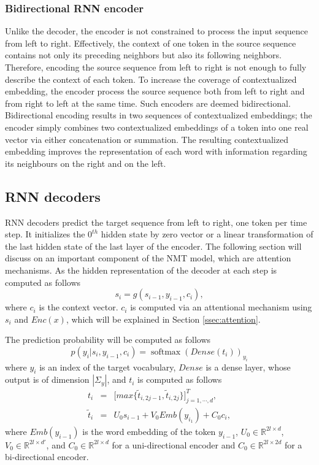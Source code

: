 \subsubsection{Bidirectional RNN encoder}
Unlike the decoder, the encoder is not constrained to process the input sequence from left to right. Effectively, the context of one token in the source sequence contains not only its preceding neighbors but also its following neighbors. Therefore, encoding the source sequence from left to right is not enough to fully describe the context of each token. To increase the coverage of contextualized embedding, the encoder process the source sequence both from left to right and from right to left at the same time. Such encoders are deemed bidirectional. Bidirectional encoding results in two sequences of contextualized embeddings; the encoder simply combines two contextualized embeddings of a token into one real vector via either concatenation or summation. The resulting contextualized embedding improves the representation of each word with information regarding its neighbours on the right and on the left.
\subsection{RNN decoders}
RNN decoders predict the target sequence from left to right, one token per time step. It initializes the $0^{th}$ hidden state by zero vector or a linear transformation of the last hidden state of the last layer of the encoder. The following section will discuss on an important component of the NMT model, which are attention mechanisms. As the hidden representation of the decoder at each step is computed as follows
\begin{equation}
s_i = g(s_{i-1},y_{i-1},c_i),
\end{equation}
where $c_i$ is the context vector. $c_i$ is computed via an attentional mechanism using $s_i$ and $Enc(x)$, which will be explained in Section \ref{ssec:attention}.

The prediction probability will be computed as follows
\begin{equation}
p(y_i|s_i,y_{i-1},c_i) = \operatorname{softmax}(Dense(t_i))_{y_i}
\end{equation}
where $y_i$ is an index of the target vocabulary, $Dense$ is a dense layer, whose output is of dimension $|\Sigma_y|$, and $t_i$ is computed as follows
\begin{equation}
\begin{array}{rcl}
t_i &=& \big[ max\big\{ \tilde{t}_{i,2j-1}, \tilde{t}_{i,2j} \big\} \big]^{T}_{j=1,\cdots,d}, \\
\tilde{t}_i &=& U_0 s_{i-1} + V_0Emb(y_{i_1}) + C_0c_i,
\end{array}
\end{equation}
where $Emb(y_{i-1})$ is the word embedding of the token $y_{i-1}$, $U_0 \in \mathbb{R}^{2l\times d}$, $V_0 \in \mathbb{R}^{2l\times d'}$, and $C_0 \in \mathbb{R}^{2l\times d}$ for a uni-directional encoder and $C_0 \in \mathbb{R}^{2l\times 2d}$ for a bi-directional encoder.
